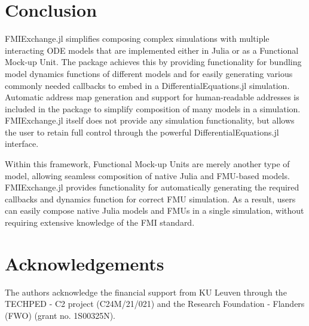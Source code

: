 \documentclass{juliacon}
\begin{document}
\section{Conclusion}
FMIExchange.jl simplifies composing complex simulations with multiple interacting ODE models that are implemented either in Julia or as a Functional Mock-up Unit.
The package achieves this by providing functionality for bundling model dynamics functions of different models and for easily generating various commonly needed callbacks to embed in a DifferentialEquations.jl simulation.
Automatic address map generation and support for human-readable addresses is included in the package to simplify composition of many models in a simulation.
FMIExchange.jl itself does not provide any simulation functionality, but allows the user to retain full control through the powerful DifferentialEquations.jl interface.

Within this framework, Functional Mock-up Units are merely another type of model, allowing seamless composition of native Julia and FMU-based models.
FMIExchange.jl provides functionality for automatically generating the required callbacks and dynamics function for correct FMU simulation.
As a result, users can easily compose native Julia models and FMUs in a single simulation, without requiring extensive knowledge of the FMI standard.

\section{Acknowledgements}
The authors acknowledge the financial support from KU Leuven through the TECHPED - C2 project (C24M/21/021) and the Research Foundation - Flanders (FWO) (grant no. 1S00325N).


\end{document}
